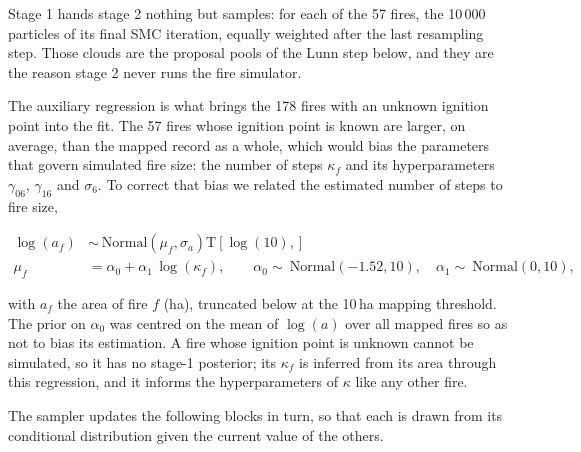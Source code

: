 \documentclass[11pt,a4paper]{article}
\begin{document}
Stage 1 hands stage 2 nothing but samples: for each of the 57 fires, the 10\,000 particles
of its final SMC iteration, equally weighted after the last resampling step. Those clouds
are the proposal pools of the Lunn step below, and they are the reason stage 2 never runs
the fire simulator.

The auxiliary regression is what brings the 178 fires with an unknown ignition point into
the fit. The 57 fires whose ignition point is known are larger, on average, than the mapped record as a whole,
which would bias the parameters that govern simulated fire size: the number of steps
$\kappa_f$ and its hyperparameters $\gamma_{06}$, $\gamma_{16}$ and $\sigma_6$. To correct
that bias we related the estimated number of steps to fire size,

\begin{equation}
\label{eq:areasteps}
\begin{aligned}
    \log(a_f) &\sim \ \text{Normal}(\mu_f, \sigma_a)\text{T}[\log(10), ] \\
    \mu_f &= \alpha_0 + \alpha_1 \, \log(\kappa_f), \qquad
    \alpha_0 \sim \ \text{Normal}(-1.52, 10), \quad
    \alpha_1 \sim \ \text{Normal}(0, 10),
\end{aligned}
\end{equation}

\noindent with $a_f$ the area of fire $f$ (ha), truncated below at the 10\,ha mapping
threshold. The prior on $\alpha_0$ was centred on the mean of $\log(a)$ over all mapped
fires so as not to bias its estimation. A fire whose ignition point is unknown cannot be
simulated, so it has no stage-1 posterior; its $\kappa_f$ is inferred from its area
through this regression, and it informs the hyperparameters of $\kappa$ like any other
fire.

The sampler updates the following blocks in turn, so that each is drawn from its
conditional distribution given the current value of the others.
\end{document}
